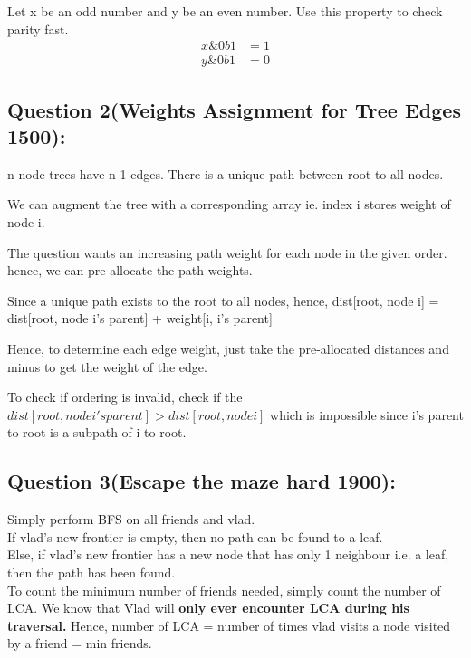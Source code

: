 \documentclass[12pt]{article}
\begin{document}
 
 Let x be an odd number and y be an even number.  Use this property to check parity fast. 
 \begin{align}
  x \& 0b1 & = 1 \\ 
  y \& 0b1 & = 0 
 \end{align} 
 
 \subsection{Question 2(Weights Assignment for Tree Edges 1500):} 
 
 n-node trees have n-1 edges. 
 There is a unique path between root to all nodes. 
 
 We can augment the tree with a corresponding array ie. index i stores weight of node i. 
 
 The question wants an increasing path weight for each node in the given order. 
 hence, we can pre-allocate the path weights. 
 
 Since a unique path exists to the root to all nodes, hence, 
 dist[root, node i] = dist[root, node i's parent] + weight[i, i's parent] 
 
 Hence, to determine each edge weight, just take the pre-allocated distances and minus to get the weight of the edge. 
 
 To check if ordering is invalid, check if the \(dist[root, node i's parent] > dist[root, node i]\) which is impossible since i's parent to root is a subpath of i to root. 
 
 \subsection{Question 3(Escape the maze hard 1900):}
 
 Simply perform BFS on all friends and vlad. \\
 If vlad's new frontier is empty, then no path can be found to a leaf. \\
 Else, if vlad's new frontier has a new node that has only 1 neighbour i.e. a leaf, then the path has been found. \\ 
 
 To count the minimum number of friends needed, simply count the number of LCA. 
 We know that Vlad will {\textbf{only ever encounter LCA during his traversal.}}
 Hence, number of LCA = number of times vlad visits a node visited by a friend = min friends.
 
\end{document}
